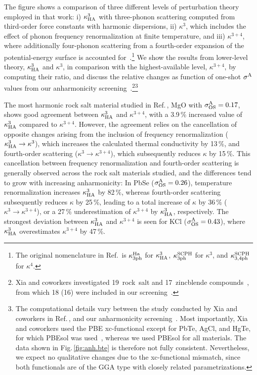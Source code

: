 The figure shows a comparison of three different levels of perturbation theory employed in that work: i) $\kappa^3_{\rm HA}$ with three-phonon scattering computed from third-order force constants with harmonic dispersions, ii) $\kappa^3$, which includes the effect of phonon frequency renormalization at finite temperature, and iii) $\kappa^{3+4}$, where additionally four-phonon scattering from a fourth-order expansion of the potential-energy surface is accounted for~\cite{Ecsedy.1976,Feng.2016, Xia.2018}.\footnote{The original nomenclature in Ref.\,\cite{Xia.2020} is $\kappa^{\rm Ha}_{\rm 3ph}$ for $\kappa^3_{\rm HA}$, $\kappa^{\rm SCPH}_{\rm 3ph}$ for $\kappa^3$, and $\kappa^{\rm SCPH}_{\rm 3,4ph}$ for $\kappa^4$.}
 We show the results from lower-level theory, $\kappa^3_{\rm HA}$ and $\kappa^3$, in comparison with the highest-available level, $\kappa^{3+4}$, by computing their ratio, and discuss the relative changes as function of one-shot $\sigma^\mathrm{A}$ values from our anharmonicity screening~\cite{Knoop.2020}.\footnote{Xia and coworkers investigated 19~rock~salt and 17~zincblende compounds~\cite{Xia.2020}, from which 18 (16) were included in our screening~\cite{Knoop.2020}.}\footnote{The computational details vary between the study conducted by Xia and coworkers in Ref.\,\cite{Xia.2020}, and our anharmonicity screening~\cite{Knoop.2020}. Most importantly, Xia and coworkers used the PBE xc-functional except for PbTe, AgCl, and HgTe, for which PBEsol was used~\cite{Perdew.1996,Perdew.2008}, whereas we used PBEsol for all materials. The data shown in Fig.\,\ref{fig:anh.bte} is therefore not fully consistent. Nevertheless, we expect no qualitative changes due to the xc-functional mismatch, since both functionals are of the GGA type with closely related parametrizations.}

The most harmonic rock salt material studied in Ref.\,\cite{Xia.2020}, MgO with $\sigma^\mathrm{A}_\mathrm{OS} = 0.17$, shows good agreement between $\kappa^3_{\rm HA}$ and $\kappa^{3+4}$, with a 3.9\,\% increased value of $\kappa^3_{\rm HA}$ compared to $\kappa^{3+4}$. However, the agreement relies on the cancellation of opposite changes arising from the inclusion of frequency renormalization ($\kappa^3_{\rm HA} \to \kappa^3$), which increases the calculated thermal conductivity by 13\,\%, and fourth-order scattering ($\kappa^3 \to \kappa^{3+4}$), which subsequently reduces $\kappa$ by 15\,\%. This cancellation between frequency renormalization and fourth-order scattering is generally observed across the rock salt materials studied, and the differences tend to grow with increasing anharmonicity: In PbSe ($\sigma^\mathrm{A}_\mathrm{OS} = 0.26$), temperature renormalization increases $\kappa^3_{\rm HA}$ by 82\,\%, whereas fourth-order scattering subsequently reduces $\kappa$ by 25\,\%, leading to a total increase of $\kappa$ by 36\,\% ($\kappa^3 \to \kappa^{3+4}$), or a 27\,\% underestimation of $\kappa^{3+4}$ by $\kappa^3_{\rm HA}$, respectively. The strongest deviation between $\kappa^3_{\rm HA}$ and $\kappa^{3+4}$ is seen for KCl ($\sigma^\mathrm{A}_\mathrm{OS} = 0.43$), where $\kappa^3_{\rm HA}$ overestimates $\kappa^{3+4}$ by 47\,\%.

